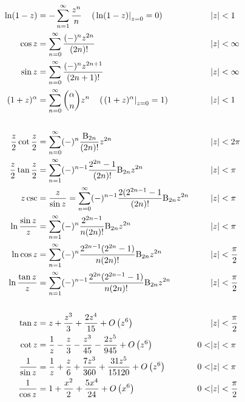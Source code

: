 \documentclass[11pt,a4paper]{article}
\newcommand{\summ}[1]{\sum_{n=#1}^\infty}
\begin{document}
\begin{enumerate}
\begin{align*}
          \ln(1-z) &= - \summ{1} \frac {z^n}{n} \quad \left(\left.\ln(1-z)\right|_{z=0} = 0\right)&&|z|<1\\
          \cos z &= \summ{0} \frac {(-)^n z^{2n}}{(2n)!} &&|z|<\infty\\
          \sin z &= \summ{0} \frac {(-)^n z^{2n+1}}{(2n+1)!} &&|z|<\infty\\
          (1+z)^\alpha &= \summ{0} \binom{\alpha}{n} z^n\quad \left(\left.(1+z)^\alpha\right|_{z=0} = 1\right) &&|z|<1\\
          \\
          \frac z2\cot\frac z2 &= \summ{0}(-)^n\frac{\B_{2n}}{(2n)!}z^{2n} &&|z|<2\pi\\
          \frac z2\tan\frac z2 &= \summ{1}(-)^{n-1}\frac{2^{2n} - 1}{(2n)!}\B_{2n}z^{2n} &&|z|<\pi\\
          z\csc &= \frac {z}{\sin z} = \summ{0} (-)^{n-1} \frac {2(2^{2n-1} -1}{(2n)!}\B_{2n}z^{2n} &&|z|<\pi\\
          \ln \frac{\sin z}z &= \summ{1} (-)^n \frac {2^{2n-1}}{n(2n)!}\B_{2n}z^{2n} &&|z|<\pi\\
          \ln \cos z &= \summ{1}(-)^n \frac {2^{2n-1}(2^{2n}-1)}{n(2n)!}\B_{2n} z^{2n} &&|z|<\frac \pi 2\\
          \ln \frac {\tan z}z &= \summ{1} (-)^{n-1}\frac {2^{2n}(2^{2n-1}-1)}{n(2n)!}\B_{2n}z^{2n} &&|z|<\frac \pi 2\\
          \\
          \tan z &= z + \frac {z^3}{3} + \frac{2z^4}{15} + O\left(z^6\right) &&|z|<\frac \pi 2\\
          \cot z &= \frac 1z - \frac z3 - \frac{z^3}{45} - \frac{2z^5}{945} + O\left(z^6\right) &0<&|z|<\pi\\
          \frac 1{\sin z} &= \frac 1z + \frac z6 + \frac{7z^3}{360} + \frac {31z^5}{15120} + O\left(z^6\right) &0<&|z|<\pi\\
          \frac 1{\cos z} &= 1 + \frac{x^2}2 + \frac{5x^4}{24} + O\left(x^6\right) &0<&|z|<\frac \pi 2
        \end{align*}
    \end{enumerate}
\end{document}
